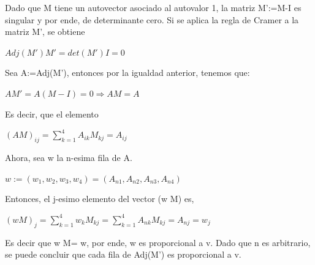 \documentclass[12pt]{article}
\begin{document}
Dado que M tiene un autovector asociado al autovalor 1, la matriz M':=M-I es singular y por ende, de 
determinante cero.
Si se aplica la regla de Cramer a la matriz M', se obtiene
\begin{center}
$Adj(M')M' = det(M')I=0$
\end{center}
Sea A:=Adj(M'), entonces por la igualdad anterior, tenemos que:
\begin{center}
$AM'=A(M-I)=0 \Rightarrow AM=A$
\end{center}
Es decir, que el elemento 
\begin{center}
$(AM)_{ij}=\sum_{k=1}^4 A_{ik} M_{kj} = A_{ij}$
\end{center}
Ahora, sea w la n-esima fila de A.
\begin{center}
$w:=(w_1,w_2,w_3,w_4)=(A_{n1},A_{n2},A_{n3},A_{n4})$
\end{center}
Entonces, el j-esimo elemento del vector (w M) es,
\begin{center}
$(w M)_j=\sum_{k=1}^4 w_k M_{kj} =\sum_{k=1}^4 A_{nk} M_{kj} = A_{nj}=w_j$
\end{center}
Es decir que w M= w, por ende, w es proporcional a v.
Dado que n es arbitrario, se puede concluir que cada fila de Adj(M') es proporcional a v.
\end{document}
